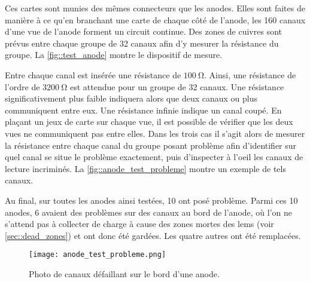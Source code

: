       Ces cartes sont munies des mêmes connecteurs que les anodes. Elles sont faites de manière à ce qu'en branchant une carte de chaque côté de l'anode, les 160 canaux d'une vue de l'anode forment un circuit continue. Des zones de cuivres sont prévus entre chaque groupe de 32 canaux afin d'y mesurer la résistance du groupe. La \autoref{fig::test_anode} montre le dispositif de mesure.

      Entre chaque canal est insérée une résistance de $\SI{100}{\ohm}$. Ainsi, une résistance de l'ordre de $\SI{3200}{\ohm}$ est attendue pour un groupe de 32 canaux. Une résistance significativement plus faible indiquera alors que deux canaux ou plus communiquent entre eux. Une résistance infinie indique un canal coupé. En plaçant un jeux de carte sur chaque vue, il est possible de vérifier que les deux vues ne communiquent pas entre elles. Dans les trois cas il s'agit alors de mesurer la résistance entre chaque canal du groupe posant problème afin d'identifier sur quel canal se situe le problème exactement, puis d'inspecter à l'oeil les canaux de lecture incriminés. La \autoref{fig::anode_test_probleme} montre un exemple de tels canaux.

      Au final, sur toutes les anodes ainsi testées, 10 ont posé problème. Parmi ces 10 anodes, 6 avaient des problèmes sur des canaux au bord de l'anode, où l'on ne s'attend pas à collecter de charge à cause des zones mortes des \glspl{lem} (voir \autoref{sec::dead_zones}) et ont donc été gardées. Les quatre autres ont été remplacées.

      \begin{figure}
        \centering
        \texttt{[image: anode\_test\_probleme.png]}
        \caption[Photo de canaux défaillant sur le bord d'une anode]{\label{fig::anode_test_probleme}Photo de canaux défaillant sur le bord d'une anode.}
      \end{figure}

